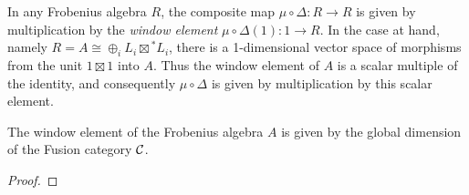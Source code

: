 \documentclass{amsart}
\begin{document}
%



In any Frobenius algebra $R$, the composite map $\mu \circ \Delta: R \to R$ is given by multiplication by the {\em window element} $\mu \circ \Delta(1): 1 \to R$. In the case at hand, namely $R = A \cong \oplus_i L_i \boxtimes {}^*L_i$, there is a 1-dimensional vector space of morphisms from the unit $1 \boxtimes 1$ into $A$. Thus the window element of $A$ is a scalar multiple of the identity, and consequently $\mu \circ \Delta$ is given by multiplication by this scalar element. 

\begin{proposition}
	The window element of the Frobenius algebra $A$ is given by the global dimension of the Fusion category $\mathcal C$. 
\end{proposition}

\begin{proof}
	

\end{proof}
\end{document}
